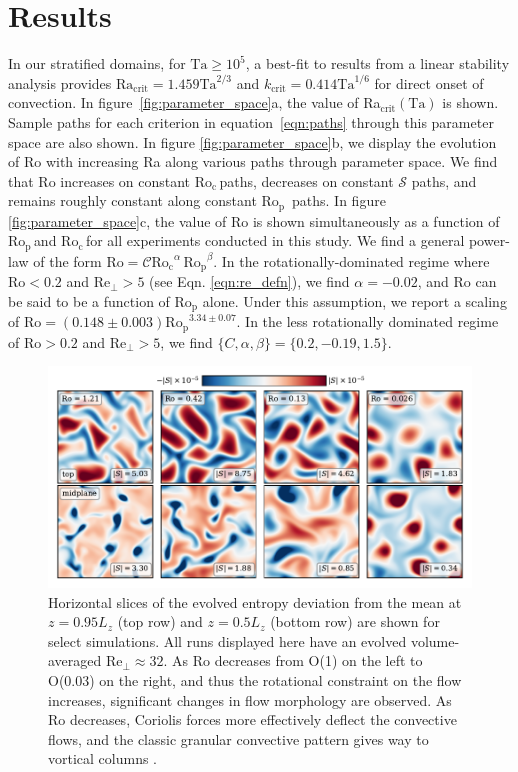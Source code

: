 \documentclass[twocolumn, amsmath, amsfonts, amssymb, trackchanges]{aastex62}
\newcommand{\pro}{\ensuremath{\text{Ro}_{\text{p}}}}
\newcommand{\con}{\ensuremath{\text{Ro}_{\text{c}}}}
\begin{document}
\section{Results}
\label{sec:results}
In our stratified domains, for $\text{Ta} \geq 10^5$, 
a best-fit to results from a linear stability
analysis provides $\text{Ra}_{\text{crit}} = 1.459\text{Ta}^{2/3}$ 
and $k_{\text{crit}} = 0.414\text{Ta}^{1/6}$ for direct onset of convection.
In figure~\ref{fig:parameter_space}a, the value of Ra$_{\text{crit}}(\text{Ta})$
is shown. Sample paths for
each criterion in equation~\ref{eqn:paths} through
this parameter space are also shown.
In figure \ref{fig:parameter_space}b, we display the evolution of Ro
with increasing Ra along various paths through parameter space.
We find that Ro increases on constant \con$\,$paths, decreases on constant $\mathcal{S}$
paths, and remains roughly constant along constant \pro$\,$ paths.
In figure \ref{fig:parameter_space}c, the value of Ro is shown simultaneously as
a function of \pro$\,$and \con$\,$for all experiments conducted in this study.
We find a general power-law of the form \mbox{$\text{Ro} = \mathcal{C} \con^{\alpha}\,\pro^{\beta}$}.
In the rotationally-dominated regime where $\text{Ro} < 0.2$ and 
$\text{Re}_{\perp} > 5$ (see Eqn. \ref{eqn:re_defn}),
we find $\alpha = -0.02$, and $\text{Ro}$ can be said to be a function
of $\pro$ alone. Under this assumption, we report a scaling of $\text{Ro} = (0.148 \pm 0.003) \pro^{3.34 \pm 0.07}$.
In the less rotationally dominated regime of $\text{Ro} > 0.2$ and $\text{Re}_{\perp} > 5$, 
we find $\{C, \alpha, \beta\} = \{0.2, -0.19, 1.5\}$.




\begin{figure}[t]
    \includegraphics[width=\textwidth]{dynamics_plot.pdf}
    \caption{ Horizontal slices of the evolved entropy deviation from the mean
	at $z = 0.95L_z$ (top row) and $z = 0.5L_z$ (bottom row) are shown for select simulations. 
	All runs displayed here have an evolved volume-averaged $\text{Re}_\perp \approx 32$. 
    As Ro decreases from O(1) on the left to O(0.03) on the right, and thus the rotational
    constraint on the flow increases, significant changes in flow morphology are observed.
    As Ro decreases, Coriolis forces more effectively
    deflect the convective flows, and the classic granular convective pattern gives way
    to vortical columns .
    \label{fig:dynamics_plot} }
\end{figure}
\end{document}
